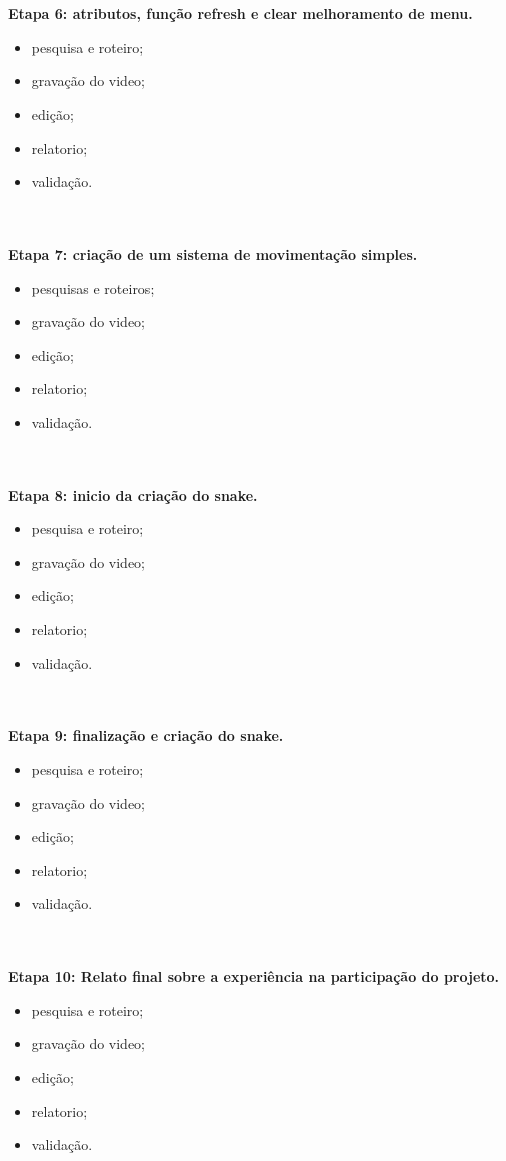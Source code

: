 \documentclass[a4paper,10pt]{article} %
\begin{document}
\\
\\
\textbf{Etapa 6: atributos, função refresh e clear melhoramento de menu.}
 \begin{itemize}
  \item pesquisa e roteiro;
  \item gravação do video;
  \item  edição;
  \item relatorio;
  \item  validação.
\end{itemize}
\\
\\
\textbf{Etapa 7: criação de um sistema de movimentação simples.}
 \begin{itemize}
  \item pesquisas e roteiros;
  \item gravação do video;
  \item  edição;
  \item relatorio;
  \item  validação.
\end{itemize}
\\
\\
\textbf{Etapa 8: inicio da criação do snake.}
 \begin{itemize}
  \item pesquisa e roteiro;
  \item gravação do video;
  \item  edição;
  \item relatorio;
  \item  validação.
\end{itemize}
\\
\\
\textbf{Etapa 9: finalização e criação do snake.}
 \begin{itemize}
  \item pesquisa e roteiro;
  \item gravação do video;
  \item  edição;
  \item relatorio;
  \item  validação.
\end{itemize}
\\
\\
\textbf{Etapa 10: Relato final sobre a experiência na participação do projeto.}
 \begin{itemize}
  \item pesquisa e roteiro;
  \item gravação do video;
  \item  edição;
  \item relatorio;
  \item  validação.
\end{itemize}
\\
\\
\end{document}
